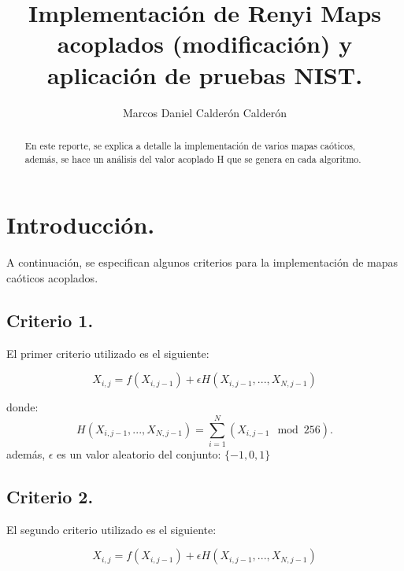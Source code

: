 \documentclass[12pt,3p]{elsarticle}
\begin{document}
\begin{frontmatter}

\title{Implementación de Renyi Maps acoplados (modificación) y aplicación de pruebas NIST.}



\author{Marcos Daniel Calderón Calderón}







\begin{abstract}
En este reporte, se explica a detalle la implementación de varios mapas caóticos, además, se hace un análisis del valor acoplado H que se genera en cada algoritmo.
\end{abstract}



\end{frontmatter}

\section{Introducción.}

A continuación, se especifican algunos criterios para la implementación de mapas caóticos acoplados. 

\subsection{Criterio 1.}

El primer criterio utilizado es el siguiente:

\begin{equation}
X_{i,j}= f(X_{i,j-1})+ \epsilon  H(X_{i,j-1},...,X_{N,j-1})
\end{equation}

donde:
\begin{equation}
H(X_{i,j-1},...,X_{N,j-1}) = \sum_{i=1}^{N}(X_{i,j-1}\mod 256).
\end{equation}
además, $\epsilon$ es un valor aleatorio del conjunto: ${\{-1, 0, 1 \}}$




\subsection{Criterio 2.}

El segundo criterio utilizado es el siguiente:

\begin{equation}
X_{i,j}= f(X_{i,j-1})+ \epsilon  H(X_{i,j-1},...,X_{N,j-1})
\end{equation}
\end{document}
